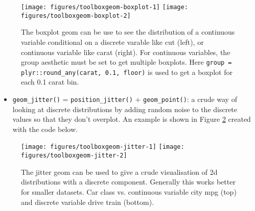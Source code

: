 \begin{figure}

{\centering \texttt{[image: figures/toolboxgeom-boxplot-1]} \texttt{[image: figures/toolboxgeom-boxplot-2]} 

}

\caption{The boxplot geom can be use to see the distribution of a continuous variable conditional on a discrete varable like cut (left), or continuous variable like carat (right). For continuous variables, the group aesthetic must be set to get multiple boxplots. Here \texttt{group = plyr::round\_any(carat, 0.1, floor)} is used to get a boxplot for each 0.1 carat bin.\label{fig:geom-boxplot}}
\end{figure}

\begin{itemize}
\itemsep1pt\parskip0pt
\item
  \texttt{geom\_jitter()} = \texttt{position\_jitter()} +
  \texttt{geom\_point()}: a crude way of looking at discrete
  distributions by adding random noise to the discrete values so that
  they don't overplot. An example is shown in Figure
  \ref{fig:geom-jitter} created with the code below. 
   
\end{itemize}

\begin{Shaded}
\begin{Highlighting}[]
\NormalTok{)}
\NormalTok{)}
\end{Highlighting}
\end{Shaded}

\begin{figure}

{\centering \texttt{[image: figures/toolboxgeom-jitter-1]} \texttt{[image: figures/toolboxgeom-jitter-2]} 

}

\caption{The jitter geom can be used to give a crude visualisation of 2d distributions with a discrete component. Generally this works better for smaller datasets. Car class vs. continuous variable city mpg (top) and discrete variable drive train (bottom).\label{fig:geom-jitter}}
\end{figure}

